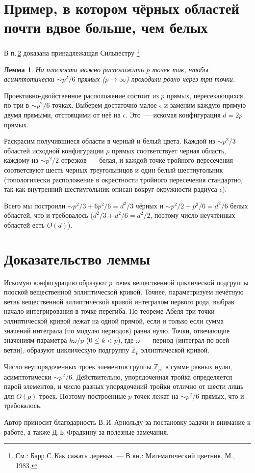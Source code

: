\documentclass[a4paper,12pt]{article}
\newtheorem{lemm}{Лемма}
\begin{document}
\section{Пример, в котором чёрных областей почти вдвое больше, чем белых}
  В п.\,\ref{sec:ex} доказана принадлежащая Сильвестру \footnote{См.: Барр С.\,Как сажать деревья. --- В кн.: Математический цветник. М., 1983.}
  \begin{lemm}
    На плоскости можно расположить \(p\) точек так, чтобы асимптотически \mbox{\(\sim p^2/6\)} прямых (\(p \to \infty\)) проходили ровно через три точки.
  \end{lemm}

  Проективно-двойственное расположение состоит из \(p\) прямых, пересекающихся по три в \mbox{\(\sim p^2/6\)} точках. Выберем достаточно малое \(\epsilon\) и заменим каждую прямую двумя прямыми, отстоящими от неё на \(\epsilon\). Это~--- искомая конфигурация \(d=2p\) прямых.

  Раскрасим получившиеся области в черный и белый цвета. Каждой из \mbox{\(\sim p^2/3\)} областей исходной конфигурации \(p\) прямых соответствует черная область, каждому из \mbox{\(\sim p^2/2\)} отрезков~--- белая, и каждой точке тройного пересечения соответсвуют шесть черных треугольницов и один белый шестиугольник (топологически расположение в окрестности тройного пересечения стандартно, так как внутренний шестиугольник описан вокруг окружности радиуса \(\epsilon\)).

  Всего мы построили \(\sim p^2/3 + 6p^2/6 = d^2/3\) чёрных и \(\sim p^2/2 + p^2/6 = d^2/6\) белых областей, что и требовалось (\(d^2/3 + d^2/6 = d^2/2\), поэтому число неучтённых областей есть \(O(d)\)).

\section{Доказательство леммы}
  \label{sec:ex}
  Искомую конфигурацию образуют \(p\) точек вещественной циклической подгруппы плоской вещественной эллиптической кривой. Точнее, параметризуем нечётную ветвь вещественной эллиптической кривой интегралом первого рода, выбрав начало интегрирования в точке перегиба. По теореме Абеля три точки эллиптической кривой лежат на одной прямой, если и только если сумма значений интеграла (по модулю периодов) равна нулю. Точки, отвечающие значениям параметра \(k\omega/p\) (\(0 \leqslant k < p\)), где \(\omega\)~--- период (интеграл по всей ветви), образуют циклическую подгруппу \(\mathbb{Z}_p\) эллиптической кривой.

  Число неупорядоченных троек элементов группы \(\mathbb{Z}_p\), в сумме равных нулю, асимптотически \mbox{\(\sim p^2/6\)}. Действительно, упорядоченная тройка определяется парой элементов, и число разных упорядочений тройки отлично от шести лишь для \(O(p)\) троек. Поэтому построенные \(p\) точек лежат на \mbox{\(\sim p^2/6\)} прямых, что и требовалось.

  Автор приносит благодарность В.\,И.\,Арнольду за постановку задачи и внимание к работе, а также Д.\,Б.\,Фрадкину за полезные замечания.
\end{document}

